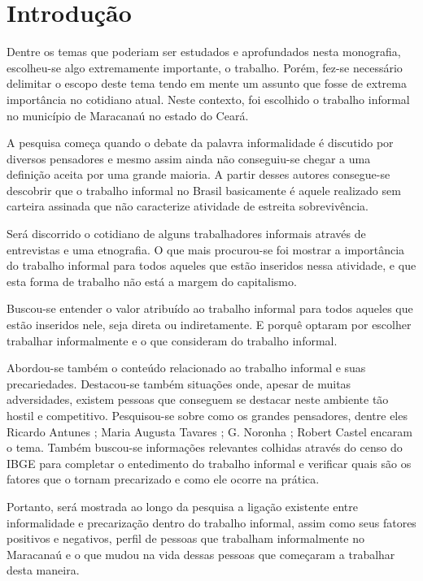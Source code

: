 \chapter{Introdução}

Dentre os temas que poderiam ser estudados e aprofundados nesta monografia, escolheu-se algo extremamente importante, o trabalho. Porém, fez-se necessário delimitar o escopo deste tema tendo em mente um assunto que fosse de extrema importância no cotidiano atual. Neste contexto, foi escolhido o trabalho informal no município de Maracanaú no estado do Ceará.

A pesquisa começa quando o debate da palavra informalidade é discutido por diversos pensadores e mesmo assim ainda não conseguiu-se chegar a uma definição aceita por uma grande maioria. A partir desses autores consegue-se descobrir que o trabalho informal no Brasil basicamente é aquele realizado sem carteira assinada que não caracterize atividade de estreita sobrevivência.

Será discorrido o cotidiano de alguns trabalhadores informais através de entrevistas e uma etnografia. O que mais procurou-se foi mostrar a importância do trabalho informal para todos aqueles que estão inseridos nessa atividade, e que esta forma de trabalho não está a margem do capitalismo.

Buscou-se entender o valor atribuído ao trabalho informal para todos aqueles que estão inseridos nele, seja direta ou indiretamente. E porquê optaram por escolher trabalhar informalmente e o que consideram do trabalho informal.

Abordou-se também o conteúdo relacionado ao trabalho informal e suas precariedades. Destacou-se também situações onde, apesar de muitas adversidades, existem pessoas que conseguem se destacar neste ambiente tão hostil e competitivo. Pesquisou-se sobre como os grandes pensadores, dentre eles Ricardo Antunes \cite{antunes1999sentidos}; Maria Augusta Tavares \cite{augusta}; G. Noronha \cite{noronha2003informal}; Robert Castel \cite{castel1998metamorfoses} encaram o tema. Também buscou-se informações relevantes colhidas através do censo do IBGE para completar o entedimento do trabalho informal e verificar quais são os fatores que o tornam precarizado e como ele ocorre na prática.

Portanto, será mostrada ao longo da pesquisa a ligação existente entre informalidade e precarização dentro do trabalho informal, assim como seus fatores positivos e negativos, perfil de pessoas que trabalham informalmente no Maracanaú e o que mudou na vida dessas pessoas que começaram a trabalhar desta maneira.
